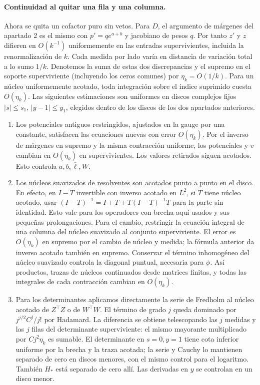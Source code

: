 \paragraph{Continuidad al quitar una fila y una columna.}
Ahora se quita un cofactor puro sin vetos. Para $D$, el argumento de márgenes del
apartado 2 es el mismo con $p'=q e^{a+b}$ y jacobiano de pesos $q$.
Por tanto $z'$ y $z$ difieren en $O(k^{-1})$ uniformemente en las entradas supervivientes,
incluida la renormalización de $k$. Cada medida por lado varía en distancia de
variación total a lo sumo $1/k$. Denotemos la suma de estas dos discrepancias y
el supremo en el soporte superviviente (incluyendo los ceros comunes) por $\eta_k=O(1/k)$.
Para un núcleo uniformemente acotado, toda integración sobre el índice suprimido
cuesta $O(\eta_k)$. Las siguientes estimaciones son uniformes en discos complejos fijos
$|s|\le s_1$, $|y-1|\le y_1$, elegidos dentro de los discos de los dos apartados anteriores.
\begin{enumerate}
\item Los potenciales antiguos restringidos, ajustados en la gauge por una constante,
satisfacen las ecuaciones nuevas con error $O(\eta_k)$. Por el inverso de márgenes
en supremo y la misma contracción uniforme, los potenciales y $v$ cambian en
$O(\eta_k)$ en supervivientes. Los valores retirados siguen acotados. Esto controla
$a,b,\bar\ell,W$.
\item Los núcleos suavizados de resolventes son acotados punto a punto en el disco.
En efecto, en $I-T$ invertible con inverso acotado en $L^2$, si $T$ tiene núcleo
acotado, usar $(I-T)^{-1}=I+T+T(I-T)^{-1}T$ para la parte sin identidad.
Esto vale para los operadores con brecha aquí usados y sus pequeñas prolongaciones.
Para el cambio, restringir la ecuación integral de una columna del núcleo suavizado
al conjunto superviviente. El error es $O(\eta_k)$ en supremo por el cambio
de núcleo y medida; la fórmula anterior da inverso acotado también en supremo.
Conservar el término inhomogéneo del núcleo suavizado controla la diagonal puntual,
necesaria para $\phi$. Así productos, trazas de núcleos continuados desde matrices finitas,
y todas las integrales de cada contracción cambian en $O(\eta_k)$.
\item Para los determinantes aplicamos directamente la serie de Fredholm al núcleo
acotado de $Z^\top Z$ o de $W^\top W$. El término de grado $j$ queda dominado por
$j^{j/2}C^j/j!$ por Hadamard. La diferencia se obtiene telescopando las $j$ medidas
y las $j$ filas del determinante superviviente: el mismo mayorante multiplicado
por $Cj^2\eta_k$ es sumable. El determinante en $s=0,y=1$ tiene cota inferior
uniforme por la brecha y la traza acotada; la serie y Cauchy lo mantienen separado
de cero en discos menores, con el mismo control para el logaritmo. También $H_*$
está separado de cero allí. Las derivadas en $y$ se controlan en un disco menor.
\end{enumerate}
